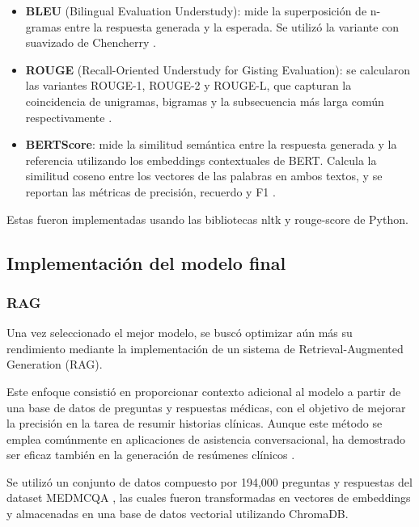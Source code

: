 \documentclass[../main.tex]{subfiles}
\begin{document}
	\begin{itemize}
		\item \textbf{BLEU} (Bilingual Evaluation Understudy): mide la superposición de n-gramas entre la respuesta generada y la esperada. Se utilizó la variante con suavizado de Chencherry \parencite{papineni-etal-2002-bleu}.
		\item \textbf{ROUGE} (Recall-Oriented Understudy for Gisting Evaluation): se calcularon las variantes ROUGE-1, ROUGE-2 y ROUGE-L, que capturan la coincidencia de unigramas, bigramas y la subsecuencia más larga común respectivamente \parencite{lin-2004-rouge}.
		\item \textbf{BERTScore}: mide la similitud semántica entre la respuesta generada y la referencia utilizando los embeddings contextuales de BERT. Calcula la similitud coseno entre los vectores de las palabras en ambos textos, y se reportan las métricas de precisión, recuerdo y F1 \parencite{zhang2020bertscoreevaluatingtextgeneration}.
		
	\end{itemize}
	
	Estas fueron implementadas usando las bibliotecas nltk y rouge-score de Python.
	


\subsection{Implementación del modelo final}
\subsubsection{RAG}

Una vez seleccionado el mejor modelo, se buscó optimizar aún más su rendimiento mediante la implementación de un sistema de Retrieval-Augmented Generation (RAG).

Este enfoque consistió en proporcionar contexto adicional al modelo a partir de una base de datos de preguntas y respuestas médicas, con el objetivo de mejorar la precisión en la tarea de resumir historias clínicas. Aunque este método se emplea comúnmente en aplicaciones de asistencia conversacional, ha demostrado ser eficaz también en la generación de resúmenes clínicos \parencite{ALKHALAF2024104662}.

Se utilizó un conjunto de datos compuesto por 194,000 preguntas y respuestas del dataset MEDMCQA \parencite{pmlr-v174-pal22a}, las cuales fueron transformadas en vectores de embeddings y almacenadas en una base de datos vectorial utilizando ChromaDB.
\end{document}
